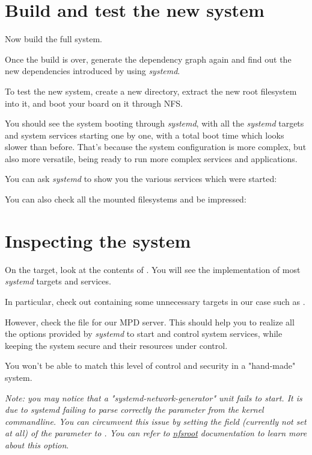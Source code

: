 \section{Build and test the new system}

Now build the full system.

Once the build is over, generate the dependency graph again and find out
the new dependencies introduced by using {\em systemd}.

To test the new system, create a new  directory, extract
the new root filesystem into it, and boot your board on it through NFS.

You should see the system booting through {\em systemd}, with all the
{\em systemd} targets and system services starting one by one, with a
total boot time which looks slower than before. That's because the
system configuration is more complex, but also more versatile, being
ready to run more complex services and applications.

You can ask {\em systemd} to show you the various services which were
started:


You can also check all the mounted filesystems and be impressed:


\section{Inspecting the system}

On the target, look at the contents of . You will
see the implementation of most {\em systemd} targets and services.

In particular, check out  containing
some unnecessary targets in our case such as .

However, check the  file for our MPD server.
This should help you to realize all the options provided
by {\em systemd} to start and control system services, while
keeping the system secure and their resources under control.

You won't be able to match this level of control and security in a
"hand-made" system.

\textit{Note: you may notice that a "systemd-network-generator" unit fails to
start. It is due to systemd failing to parse correctly the 
parameter from the kernel commandline. You can circumvent this issue by
setting the  field (currently not set at all) of the
 parameter to . You can refer to
\href{https://www.kernel.org/doc/Documentation/filesystems/nfs/nfsroot.txt}{nfsroot}
documentation to learn more about this option}.

